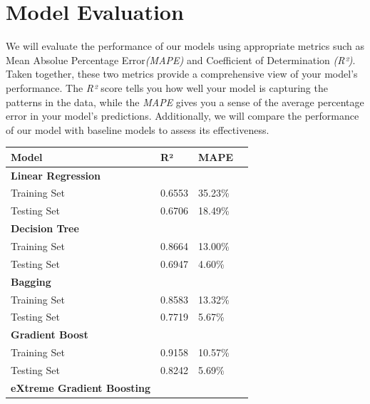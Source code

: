 \documentclass[conference]{IEEEtran}
\begin{document}
    
\section{Model Evaluation}
    We will evaluate the performance of our models using appropriate metrics such as Mean Absolue Percentage Error\textit{(MAPE)} and Coefficient of Determination \textit{(R²)}. Taken together, these two metrics provide a comprehensive view of your model’s performance. The \textit{R²} score tells you how well your model is capturing the patterns in the data, while the \textit{MAPE} gives you a sense of the average percentage error in your model’s predictions. Additionally, we will compare the performance of our model with baseline models to assess its effectiveness.
    
    \begin{table}[h]
        \centering
        \renewcommand{\arraystretch}{1.1}
        \begin{tabular}{
            | p{}
            | p{} 
            | p{} |
            | p{}
            }
            \hline
            \textbf{Model} & \textbf{R²} & \textbf{MAPE} \\
            \hline
            \multicolumn{1}{|l}{\textbf{Linear Regression}} \\
            \hline
            Training Set   & 0.6553 & 35.23\% \\
            \hline
            Testing Set & 0.6706 & 18.49\% \\
            \hline
            \multicolumn{1}{|l}{\textbf{Decision Tree}}\\
            \hline
            Training Set & 0.8664 & 13.00\% \\
            \hline
            Testing Set & 0.6947 & 4.60\%\\
            \hline
            \multicolumn{1}{|l}{\textbf{Bagging}} \\
            \hline
            Training Set & 0.8583 & 13.32\% \\
            \hline
            Testing Set & 0.7719 & 5.67\% \\
            \hline
            \multicolumn{1}{|l}{\textbf{Gradient Boost}}\\
            \hline
            Training Set & 0.9158 & 10.57\% \\
            \hline
            Testing Set & 0.8242 & 5.69\% \\
            \hline
            \multicolumn{1}{|l}{\textbf{eXtreme Gradient Boosting}}\\

\end{tabular}
\end{table}
\end{document}
